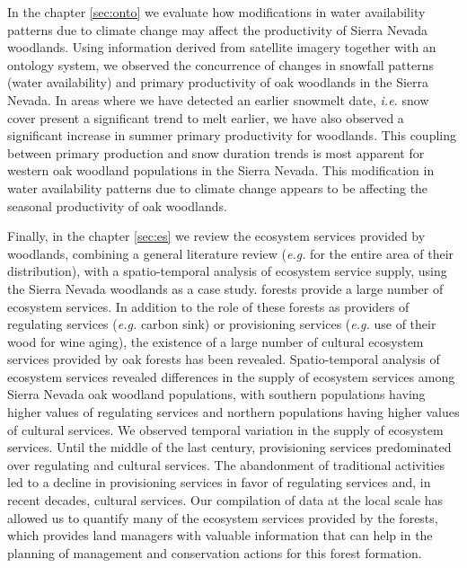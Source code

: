 In the \textcolor{ctcolormain}{chapter \ref{sec:onto}} we evaluate how modifications in water availability patterns due to climate change may affect the productivity of Sierra Nevada \Qp woodlands. Using information derived from satellite imagery together with an ontology system, we observed the concurrence of changes in snowfall patterns (water availability) and primary productivity of oak woodlands in the Sierra Nevada. In areas where we have detected an earlier snowmelt date, \emph{i.e.} snow cover present a significant trend to melt earlier, we have also observed a significant increase in summer primary productivity for \Qp woodlands. This coupling between primary production and snow duration trends is most apparent for western oak woodland populations in the Sierra Nevada. This modification in water availability patterns due to climate change appears to be affecting the seasonal productivity of oak woodlands.

Finally, in the \textcolor{ctcolormain}{chapter \ref{sec:es}} we review the ecosystem services provided by \Qp woodlands, combining a general literature review (\emph{e.g.} for the entire area of their distribution), with a spatio-temporal analysis of ecosystem service supply, using the Sierra Nevada \Qp woodlands as a case study. \Qp forests provide a large number of ecosystem services. In addition to the role of these forests as providers of regulating services (\emph{e.g.} carbon sink) or provisioning services (\emph{e.g.} use of their wood for wine aging), the existence of a large number of cultural ecosystem services provided by oak forests has been revealed. Spatio-temporal analysis of ecosystem services revealed differences in the supply of ecosystem services among Sierra Nevada oak woodland populations, with southern populations having higher values of regulating services and northern populations having higher values of cultural services. We observed temporal variation in the supply of ecosystem services. Until the middle of the last century, provisioning services predominated over regulating and cultural services. The abandonment of traditional activities led to a decline in provisioning services in favor of regulating services and, in recent decades, cultural services. Our compilation of data at the local scale has allowed us to quantify many of the ecosystem services provided by the \Qp forests, which provides land managers with valuable information that can help in the planning of management and conservation actions for this forest formation. 